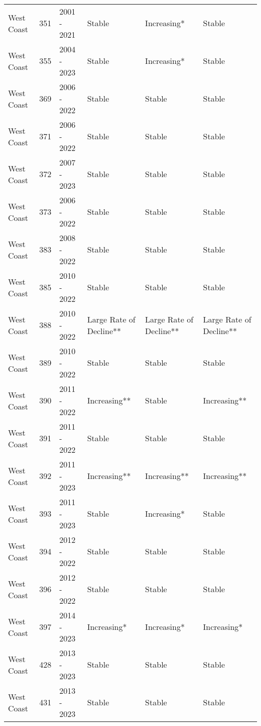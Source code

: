 \documentclass[
]{article}
\begin{document}
\begin{longtable}{lllp{0.9in}p{0.9in}p{0.9in}}
   \rowcolor{stable}West Coast & 351 & 2001 - 2021 & Stable & Increasing* & Stable \\ 
   \rowcolor{stable}West Coast & 355 & 2004 - 2023 & Stable & Increasing* & Stable \\ 
   \rowcolor{stable}West Coast & 369 & 2006 - 2022 & Stable & Stable & Stable \\ 
   \rowcolor{stable}West Coast & 371 & 2006 - 2022 & Stable & Stable & Stable \\ 
   \rowcolor{stable}West Coast & 372 & 2007 - 2023 & Stable & Stable & Stable \\ 
   \rowcolor{stable}West Coast & 373 & 2006 - 2022 & Stable & Stable & Stable \\ 
   \rowcolor{stable}West Coast & 383 & 2008 - 2022 & Stable & Stable & Stable \\ 
   \rowcolor{stable}West Coast & 385 & 2010 - 2022 & Stable & Stable & Stable \\ 
   \rowcolor{large}West Coast & 388 & 2010 - 2022 & Large Rate of Decline** & Large Rate of Decline** & Large Rate of Decline** \\ 
   \rowcolor{stable}West Coast & 389 & 2010 - 2022 & Stable & Stable & Stable \\ 
   \rowcolor{increasing}West Coast & 390 & 2011 - 2022 & Increasing** & Stable & Increasing** \\ 
   \rowcolor{stable}West Coast & 391 & 2011 - 2022 & Stable & Stable & Stable \\ 
   \rowcolor{increasing}West Coast & 392 & 2011 - 2023 & Increasing** & Increasing** & Increasing** \\ 
   \rowcolor{stable}West Coast & 393 & 2011 - 2023 & Stable & Increasing* & Stable \\ 
   \rowcolor{stable}West Coast & 394 & 2012 - 2022 & Stable & Stable & Stable \\ 
   \rowcolor{stable}West Coast & 396 & 2012 - 2022 & Stable & Stable & Stable \\ 
   \rowcolor{increasing}West Coast & 397 & 2014 - 2023 & Increasing* & Increasing* & Increasing* \\ 
   \rowcolor{stable}West Coast & 428 & 2013 - 2023 & Stable & Stable & Stable \\ 
   \rowcolor{stable}West Coast & 431 & 2013 - 2023 & Stable & Stable & Stable \\ 
   \bottomrule
\end{longtable}
\end{document}
